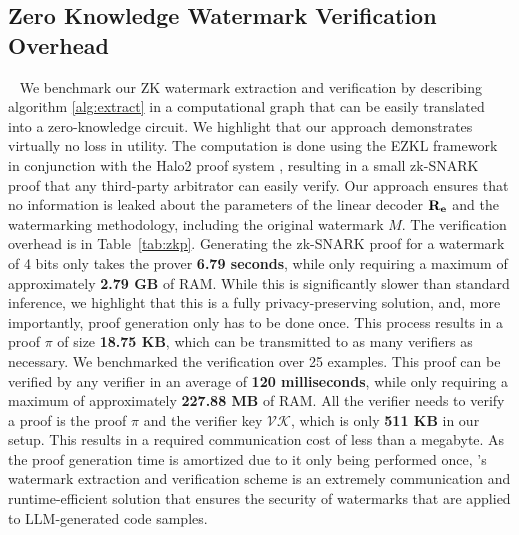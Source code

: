 \subsection{Zero Knowledge Watermark Verification Overhead}~\label{subsec:zkp_perform}
We benchmark our ZK watermark extraction and verification by describing algorithm \ref{alg:extract} in a computational graph that can be easily translated into a zero-knowledge circuit. We highlight that our approach demonstrates virtually no loss in utility. The computation is done using the EZKL framework \cite{ezkl} in conjunction with the Halo2 proof system \cite{halo2_repo}, resulting in a small zk-SNARK proof that any third-party arbitrator can easily verify. Our approach ensures that no information is leaked about the parameters of the linear decoder $\bf{R}_e$ and the watermarking methodology, including the original watermark $M$. The verification overhead is in Table~\ref{tab:zkp}. Generating the zk-SNARK proof for a watermark of 4 bits only takes the prover \Prv \textbf{6.79 seconds}, while only requiring a maximum of approximately \textbf{2.79 GB} of RAM. While this is significantly slower than standard inference, we highlight that this is a fully privacy-preserving solution, and, more importantly, proof generation only has to be done once. This process results in a proof $\pi$ of size \textbf{18.75 KB}, which can be transmitted to as many verifiers as necessary. We benchmarked the verification over 25 examples. This proof can be verified by any verifier \Vrf in an average of \textbf{120 milliseconds}, while only requiring a maximum of approximately \textbf{227.88 MB} of RAM. All the verifier needs to verify a proof is the proof $\pi$ and the verifier key $\mathcal{VK}$, which is only \textbf{511 KB} in our setup. This results in a required communication cost of less than a megabyte. As the proof generation time is amortized due to it only being performed once, \sys{}'s watermark extraction and verification scheme is an extremely communication and runtime-efficient solution that ensures the security of watermarks that are applied to LLM-generated code samples.

\begin{table}[!ht]
    \centering
   
    \vspace{-5pt}
    \caption{Zero-knowledge Watermark Verification Overhead }
    \vspace{-10pt}
    \label{tab:zkp}
\end{table}

